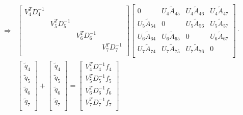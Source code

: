 %
\begin{align*}
    \Rightarrow
    &
    \begin{bmatrix}
        V^T_4D_4^{-1}    & & & \\
        & V^T_5D_5^{-1}    & & \\
        & & V^T_6D_6^{-1}    & \\
        & & & V^T_7D_7^{-1}    \\
    \end{bmatrix}
\begin{bmatrix}
    0    & U_4\widetilde{A}_{45} & U_4\widetilde{A}_{46} & U_4\widetilde{A}_{47} \\
    U_5\widetilde{A}_{54} & 0 & U_5\widetilde{A}_{56} & U_5\widetilde{A}_{57} \\
    U_6\widetilde{A}_{64} & U_6\widetilde{A}_{65} & 0 & U_6\widetilde{A}_{67} \\
    U_7\widetilde{A}_{74} & U_7\widetilde{A}_{75} & U_7\widetilde{A}_{76} &    0 \\
\end{bmatrix}
\cdot
\\
&
\begin{bmatrix}
    \widetilde{q}_4 \\
    \widetilde{q}_5 \\
    \widetilde{q}_6 \\
    \widetilde{q}_7 \\
\end{bmatrix}
+
\begin{bmatrix}
    \widetilde{q}_4 \\
    \widetilde{q}_5 \\
    \widetilde{q}_6 \\
    \widetilde{q}_7 \\
\end{bmatrix}
=
\begin{bmatrix}
    V^T_4D_4^{-1}f_4 \\
    V^T_5D_5^{-1}f_5 \\
    V^T_6D_6^{-1}f_6 \\
    V^T_7D_7^{-1}f_7 \\
\end{bmatrix}
\end{align*}

